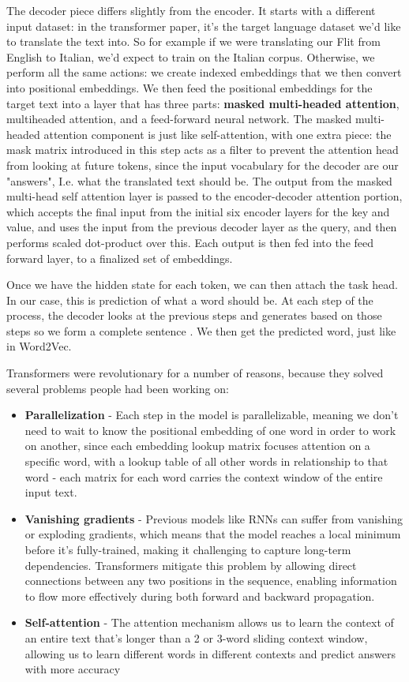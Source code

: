 \documentclass[11pt, table]{diazessay} %
\begin{document}
\begin{sloppypar}
The decoder piece differs slightly from the encoder. It starts with a different input dataset: in the transformer paper, it's the target language dataset we'd like to translate the text into.  So for example if we were translating our Flit from English to Italian, we'd expect to train on the Italian corpus. Otherwise, we perform all the same actions: we create indexed embeddings that we then convert into positional embeddings. We then feed the positional embeddings for the target text into a layer that has three parts: \textbf{masked multi-headed attention}, multiheaded attention, and a feed-forward neural network. The masked multi-headed attention component is just like self-attention, with one extra piece: the mask matrix introduced in this step acts as a filter to prevent the attention head from looking at future tokens, since the input vocabulary for the decoder are our "answers", I.e. what the translated text should be. The output from the masked multi-head self attention layer is passed to the encoder-decoder attention portion, which accepts the final input from the initial six encoder layers for the key and value, and uses the input from the previous decoder layer as the query, and then performs scaled dot-product over this. Each output is then fed into the feed forward layer, to a finalized set of embeddings.

Once we have the hidden state for each token, we can then attach the task head. In our case, this is prediction of what a word should be.  At each step of the process, the decoder looks at the previous steps and generates based on those steps so we form a complete sentence \citep{rush2018annotated}. We then get the predicted word, just like in Word2Vec.

Transformers were revolutionary for a number of reasons, because they solved several problems people had been working on:
\begin{itemize}
\item\textbf{Parallelization} - Each step in the model is parallelizable, meaning we don't need to wait to know the positional embedding of one word in order to work on another, since each embedding lookup matrix focuses attention on a specific word, with a lookup table of all other words in relationship to that word - each matrix for each word carries the context window of the entire input text.
\item\textbf{Vanishing gradients} - Previous models like RNNs can suffer from vanishing or exploding gradients, which means that the model reaches a local minimum before it's fully-trained, making it challenging to capture long-term dependencies. Transformers mitigate this problem by allowing direct connections between any two positions in the sequence, enabling information to flow more effectively during both forward and backward propagation.
\item\textbf{Self-attention} - The attention mechanism allows us to learn the context of an entire text that's longer than a 2 or 3-word sliding context window, allowing us to learn different words in different contexts and predict answers with more accuracy
\end{itemize}



\end{sloppypar}
\end{document}
